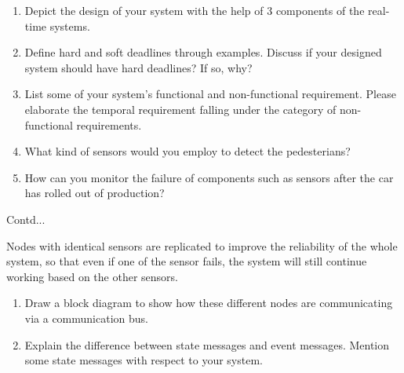 \begin{enumerate}

\item Depict the design of your system with the help of 3 components of the real-time systems.
\item Define hard and soft deadlines through examples. Discuss if your designed system should have hard deadlines? If so, why?
\item List some of your system's functional and non-functional requirement. Please elaborate the temporal requirement falling under the category of non-functional requirements.
\item What kind of sensors would you employ to detect the pedesterians? 
\item How can you monitor the failure of components such as sensors after the car has rolled out of production?

\end{enumerate}


\newpage

Contd...


\pagebreak

Nodes with identical sensors are replicated to improve the reliability of the whole system, so that even if one of the sensor fails, the system will still continue working based on the other sensors. 

\begin{enumerate}
\item Draw a block diagram to show how these different nodes are communicating via a communication bus.
\item Explain the difference between state messages and event messages. Mention some state messages with respect to your system.
\end{enumerate}


